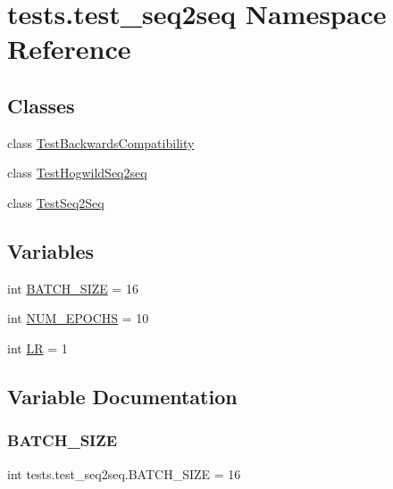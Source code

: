\hypertarget{namespacetests_1_1test__seq2seq}{}\section{tests.\+test\+\_\+seq2seq Namespace Reference}
\label{namespacetests_1_1test__seq2seq}
\subsection*{Classes}
\begin{DoxyCompactItemize}
\item 
class \hyperlink{classtests_1_1test__seq2seq_1_1TestBackwardsCompatibility}{Test\+Backwards\+Compatibility}
\item 
class \hyperlink{classtests_1_1test__seq2seq_1_1TestHogwildSeq2seq}{Test\+Hogwild\+Seq2seq}
\item 
class \hyperlink{classtests_1_1test__seq2seq_1_1TestSeq2Seq}{Test\+Seq2\+Seq}
\end{DoxyCompactItemize}
\subsection*{Variables}
\begin{DoxyCompactItemize}
\item 
int \hyperlink{namespacetests_1_1test__seq2seq_aee85d0c290120a96250b6139ac2f43e4}{B\+A\+T\+C\+H\+\_\+\+S\+I\+ZE} = 16
\item 
int \hyperlink{namespacetests_1_1test__seq2seq_ab3399ea30b5c0b509ef2c0f38f51ce05}{N\+U\+M\+\_\+\+E\+P\+O\+C\+HS} = 10
\item 
int \hyperlink{namespacetests_1_1test__seq2seq_ab827bc994f6e9df276190043cc2f781b}{LR} = 1
\end{DoxyCompactItemize}


\subsection{Variable Documentation}
\mbox{\label{namespacetests_1_1test__seq2seq_aee85d0c290120a96250b6139ac2f43e4}} 
\subsubsection{\texorpdfstring{B\+A\+T\+C\+H\+\_\+\+S\+I\+ZE}{BATCH\_SIZE}}
{\footnotesize\ttfamily int tests.\+test\+\_\+seq2seq.\+B\+A\+T\+C\+H\+\_\+\+S\+I\+ZE = 16}




